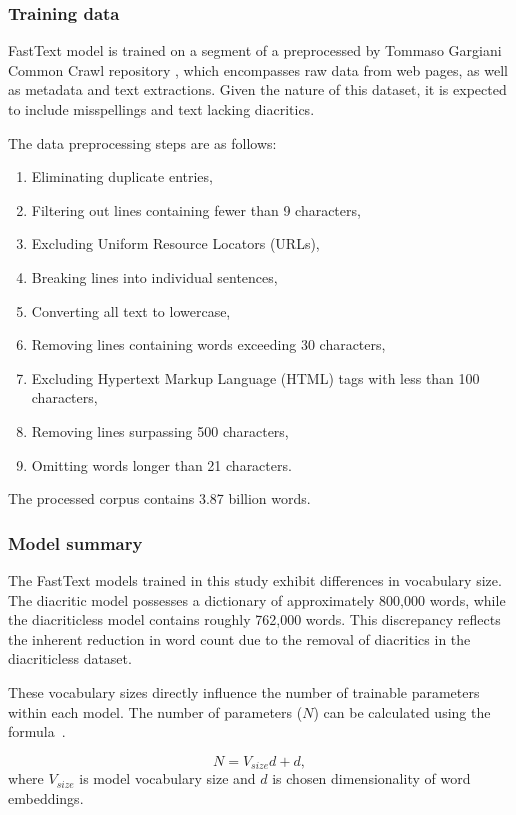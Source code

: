 \subsubsection{Training data}

FastText model is trained on a segment of a preprocessed by Tommaso Gargiani Common Crawl repository \cite{commoncrawl}, which encompasses raw data from web pages, as well as metadata and text extractions.
Given the nature of this dataset, it is expected to include misspellings and text lacking diacritics.

The data preprocessing steps are as follows:
\begin{enumerate}
  \item Eliminating duplicate entries,
  \item Filtering out lines containing fewer than 9 characters,
  \item Excluding Uniform Resource Locators (URLs),
  \item Breaking lines into individual sentences,
  \item Converting all text to lowercase,
  \item Removing lines containing words exceeding 30 characters,
  \item Excluding Hypertext Markup Language (HTML) tags with less than 100 characters,
  \item Removing lines surpassing 500 characters,
  \item Omitting words longer than 21 characters.
\end{enumerate}

The processed corpus contains 3.87 billion words.

\subsubsection{Model summary}

The FastText models trained in this study exhibit differences in vocabulary size.
The diacritic model possesses a dictionary of approximately 800,000 words, while the diacriticless model contains roughly 762,000 words.
This discrepancy reflects the inherent reduction in word count due to the removal of diacritics in the diacriticless dataset.

These vocabulary sizes directly influence the number of trainable parameters within each model.
The number of parameters ($N$) can be calculated using the formula~.

\begin{equation}
 N = V_{size}d + d,
  \label{eq:cbow_parameters}
\end{equation}
where $V_{size}$ is model vocabulary size and $d$ is chosen dimensionality of word embeddings.
  
